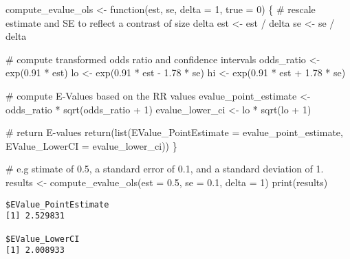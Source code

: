 \documentclass[
  singlecolumn]{article}
\newenvironment{Shaded}{\begin{snugshade}}{\end{snugshade}}
\newcommand{\AttributeTok}[1]{\textcolor[rgb]{0.40,0.45,0.13}{#1}}
\newcommand{\CommentTok}[1]{\textcolor[rgb]{0.37,0.37,0.37}{#1}}
\newcommand{\ControlFlowTok}[1]{\textcolor[rgb]{0.00,0.23,0.31}{#1}}
\newcommand{\DecValTok}[1]{\textcolor[rgb]{0.68,0.00,0.00}{#1}}
\newcommand{\FloatTok}[1]{\textcolor[rgb]{0.68,0.00,0.00}{#1}}
\newcommand{\FunctionTok}[1]{\textcolor[rgb]{0.28,0.35,0.67}{#1}}
\newcommand{\NormalTok}[1]{\textcolor[rgb]{0.00,0.23,0.31}{#1}}
\newcommand{\OtherTok}[1]{\textcolor[rgb]{0.00,0.23,0.31}{#1}}
\newcommand{\SpecialCharTok}[1]{\textcolor[rgb]{0.37,0.37,0.37}{#1}}
\begin{document}
\begin{Shaded}
\begin{Highlighting}[]
\NormalTok{compute\_evalue\_ols }\OtherTok{\textless{}{-}} \ControlFlowTok{function}\NormalTok{(est, se, }\AttributeTok{delta =} \DecValTok{1}\NormalTok{, }\AttributeTok{true =} \DecValTok{0}\NormalTok{) \{}
  \CommentTok{\# rescale estimate and SE to reflect a contrast of size delta}
\NormalTok{  est }\OtherTok{\textless{}{-}}\NormalTok{ est }\SpecialCharTok{/}\NormalTok{ delta}
\NormalTok{  se }\OtherTok{\textless{}{-}}\NormalTok{ se }\SpecialCharTok{/}\NormalTok{ delta}

  \CommentTok{\# compute transformed odds ratio and confidence intervals}
\NormalTok{  odds\_ratio }\OtherTok{\textless{}{-}} \FunctionTok{exp}\NormalTok{(}\FloatTok{0.91} \SpecialCharTok{*}\NormalTok{ est)}
\NormalTok{  lo }\OtherTok{\textless{}{-}} \FunctionTok{exp}\NormalTok{(}\FloatTok{0.91} \SpecialCharTok{*}\NormalTok{ est }\SpecialCharTok{{-}} \FloatTok{1.78} \SpecialCharTok{*}\NormalTok{ se)}
\NormalTok{  hi }\OtherTok{\textless{}{-}} \FunctionTok{exp}\NormalTok{(}\FloatTok{0.91} \SpecialCharTok{*}\NormalTok{ est }\SpecialCharTok{+} \FloatTok{1.78} \SpecialCharTok{*}\NormalTok{ se)}

  \CommentTok{\# compute E{-}Values based on the RR values}
\NormalTok{  evalue\_point\_estimate }\OtherTok{\textless{}{-}}\NormalTok{ odds\_ratio }\SpecialCharTok{*} \FunctionTok{sqrt}\NormalTok{(odds\_ratio }\SpecialCharTok{+} \DecValTok{1}\NormalTok{)}
\NormalTok{  evalue\_lower\_ci }\OtherTok{\textless{}{-}}\NormalTok{ lo }\SpecialCharTok{*} \FunctionTok{sqrt}\NormalTok{(lo }\SpecialCharTok{+} \DecValTok{1}\NormalTok{)}

  \CommentTok{\# return E{-}values}
  \FunctionTok{return}\NormalTok{(}\FunctionTok{list}\NormalTok{(}\AttributeTok{EValue\_PointEstimate =}\NormalTok{ evalue\_point\_estimate,}
              \AttributeTok{EValue\_LowerCI =}\NormalTok{ evalue\_lower\_ci))}
\NormalTok{\}}

\CommentTok{\# e.g stimate of 0.5, a standard error of 0.1, and a standard deviation of 1.}
\NormalTok{results }\OtherTok{\textless{}{-}} \FunctionTok{compute\_evalue\_ols}\NormalTok{(}\AttributeTok{est =} \FloatTok{0.5}\NormalTok{, }\AttributeTok{se =} \FloatTok{0.1}\NormalTok{, }\AttributeTok{delta =} \DecValTok{1}\NormalTok{)}
\FunctionTok{print}\NormalTok{(results)}
\end{Highlighting}
\end{Shaded}

\begin{verbatim}
$EValue_PointEstimate
[1] 2.529831

$EValue_LowerCI
[1] 2.008933
\end{verbatim}
\end{document}
